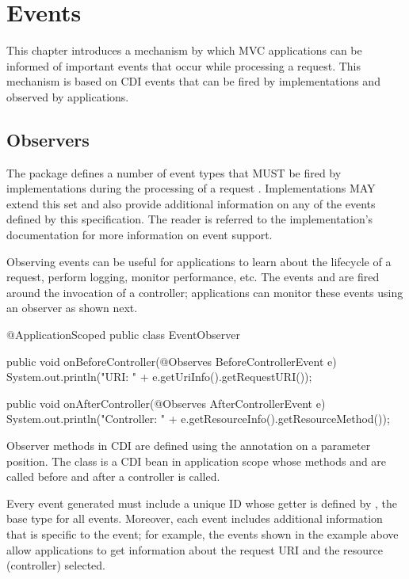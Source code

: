 \chapter{Events}
\label{events}

This chapter introduces a mechanism by which MVC applications can be informed 
of important events that occur while processing a request. This mechanism 
is based on CDI events that can be fired by implementations and observed by 
applications.

\section{Observers}
\label{observers}

The package  defines a number of event types that MUST be 
fired by implementations during the processing of a request . 
Implementations MAY
extend this set and also provide additional information on any of the events defined
by this specification. The reader is referred to the implementation's documentation
for more information on event support.

Observing events can be useful for applications to learn about the lifecycle of a 
request, perform logging, monitor performance, etc. The events
 and  are fired around
the invocation of a controller; applications can monitor these events using an 
observer as shown next.

\begin{listing}{1}
@ApplicationScoped
public class EventObserver {

    public void onBeforeController(@Observes BeforeControllerEvent e) {
        System.out.println("URI: " + e.getUriInfo().getRequestURI());
    }
    
    public void onAfterController(@Observes AfterControllerEvent e) {
        System.out.println("Controller: " + 
            e.getResourceInfo().getResourceMethod());
    }
}
\end{listing}

Observer methods in CDI are defined using the  annotation on 
a parameter position.
The class  is a CDI bean in application scope whose methods
 and  are called 
before and after a controller is called. 

Every event generated must include a
unique ID whose getter is defined by , the base type for all
events. Moreover, each event includes additional information that is specific to
the event; for example, the events shown in the example above allow applications
to get information about the request URI and the resource (controller) selected.

